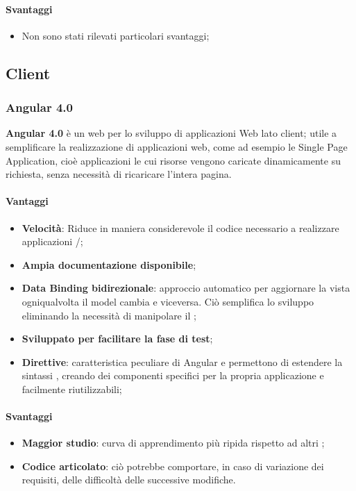 	\paragraph{Svantaggi}
	\begin{itemize}
	\item Non sono stati rilevati particolari svantaggi;
	\end{itemize}
\subsection{Client}

	\subsubsection{Angular 4.0}
	\textbf{Angular 4.0} è un  web  per lo sviluppo di applicazioni Web lato client; utile a semplificare la realizzazione di applicazioni web, come ad esempio le Single Page Application, cioè applicazioni le cui risorse vengono caricate dinamicamente su richiesta, senza necessità di ricaricare l’intera pagina.

\paragraph{Vantaggi}
\begin{itemize}
\item \textbf{Velocità}: Riduce in maniera considerevole il codice necessario a realizzare applicazioni /;
\item \textbf{Ampia documentazione disponibile};
\item \textbf{Data Binding bidirezionale}: approccio automatico per aggiornare la vista ogniqualvolta il model cambia e viceversa. Ciò semplifica lo sviluppo eliminando la necessità di manipolare il ;
\item \textbf{Sviluppato per facilitare la fase di test};
\item \textbf{Direttive}: caratteristica peculiare di Angular e permettono di estendere la sintassi  , creando dei componenti specifici per la propria applicazione e facilmente riutilizzabili;
\end{itemize}

\paragraph{Svantaggi}
\begin{itemize}
\item \textbf{Maggior studio}: curva di apprendimento più ripida rispetto ad altri ;
\item \textbf{Codice articolato}: ciò potrebbe comportare, in caso di variazione dei requisiti, delle difficoltà delle successive modifiche.
\end{itemize}

